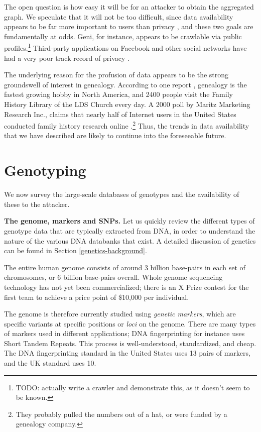 \documentclass{article}
\begin{document}
The open question is how easy it will be for an attacker to obtain the aggregated graph. We speculate that it will not be too difficult, since data availability appears to be far more important to users than privacy \cite{wp-geni.com}, and these two goals are fundamentally at odds. Geni, for instance, appears to be crawlable via public profiles.\footnote{TODO: actually write a crawler and demonstrate this, as it doesn't seem to be known.}  Third-party applications on Facebook and other social networks have had a very poor track record of privacy \cite{felt-evans}.

The underlying reason for the profusion of data appears to be the strong groundswell of interest in genealogy. According to one report \cite{hobby}, genealogy is the fastest growing hobby in North America, and 2400 people visit the Family History Library of the LDS Church every day. A 2000 poll by Maritz Marketing Research Inc., claims that nearly half of Internet users in the United States conducted family history research online \cite{maritz-poll}.\footnote{They probably pulled the numbers out of a hat, or were funded by a genealogy company.} Thus, the trends in data availability that we have described are likely to continue into the foreseeable future.


\section{Genotyping}
\label{genotype-survey}
We now survey the large-scale databases of genotypes and the availability of these to the attacker. 

{\bf The genome, markers and SNPs.} 
Let us quickly review the different types of genotype data that are typically extracted from DNA, in order to understand the nature of the various DNA databanks that exist. A detailed discussion of genetics can be found in Section \ref{genetics-background}.

The entire human genome consists of around 3 billion base-pairs in each set of chromosomes, or 6 billion base-pairs overall. Whole genome sequencing technology has not yet been commercialized; there is an X Prize contest for the first team to achieve a price point of \$10,000 per individual.

The genome is therefore currently studied using {\em genetic markers}, which are specific variants at specific positions or {\em loci} on the genome.  There are many types of markers used in different applications; DNA fingerprinting for instance uses Short Tandem Repeats. This process is well-understood, standardized, and cheap. The DNA fingerprinting standard in the United States uses 13 pairs of markers, and the UK standard uses 10.
\end{document}
